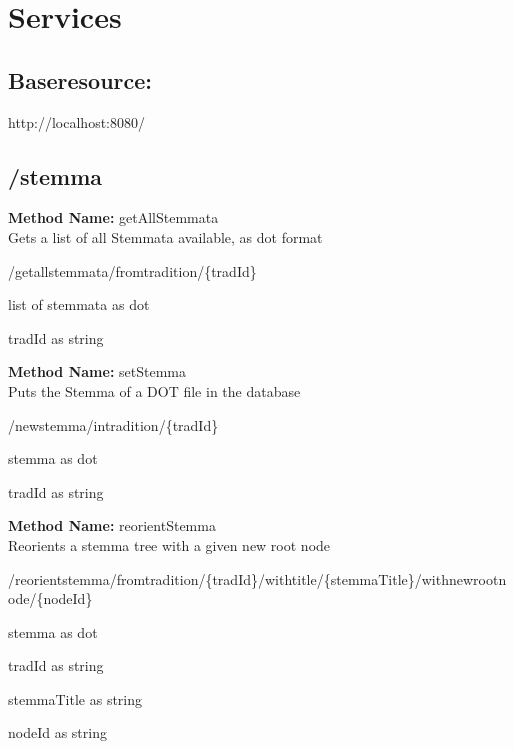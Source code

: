 
\chapter{Services}
\section{Baseresource: }
http://localhost:8080/
\section{/stemma}
\textbf{Method Name: }getAllStemmata \\ Gets a list of all Stemmata available, as dot format
\begin{get}
/getallstemmata/fromtradition/\{tradId\}
\end{get}
\begin{response}
list of stemmata as dot
\end{response}
\begin{parameter}
tradId as string
\end{parameter}
\textbf{Method Name: }setStemma \\ Puts the Stemma of a DOT file in the database
\begin{post}
/newstemma/intradition/\{tradId\}
\end{post}
\begin{response}
stemma as dot
\end{response}
\begin{parameter}
tradId as string
\end{parameter}
\textbf{Method Name: }reorientStemma \\ Reorients a stemma tree with a given new root node
\begin{post}
/reorientstemma/fromtradition/\{tradId\}/withtitle/\{stemmaTitle\}/withnewrootnode/\{nodeId\}
\end{post}
\begin{response}
stemma as dot
\end{response}
\begin{parameter}
tradId as string
\end{parameter}
\begin{parameter}
stemmaTitle as string
\end{parameter}
\begin{parameter}
nodeId as string
\end{parameter}
